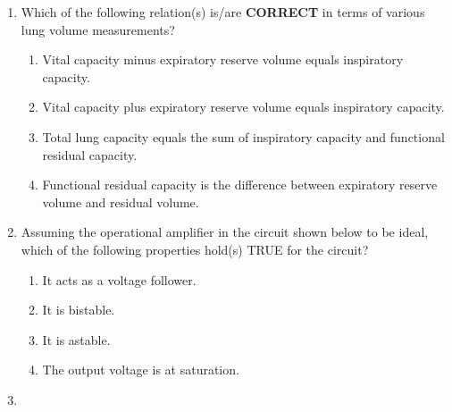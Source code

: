 \documentclass[journal]{IEEEtran}
\begin{document}
\begin{enumerate}
\item 
Which of the following relation(s) is/are \textbf{CORRECT} in terms of various lung volume measurements?

\begin{enumerate}[label=(\Alph*)]
    \item Vital capacity minus expiratory reserve volume equals inspiratory capacity.
    \item Vital capacity plus expiratory reserve volume equals inspiratory capacity.
    \item Total lung capacity equals the sum of inspiratory capacity and functional residual capacity.
    \item Functional residual capacity is the difference between expiratory reserve volume and residual volume.
\end{enumerate}
\hfill{}

\item 
Assuming the operational amplifier in the circuit shown below to be ideal, which of the following properties hold(s) TRUE for the circuit?

\begin{figure}[H]
\centering
{}%

\label{fig:my_label}
\end{figure}

\begin{enumerate}[label=(\Alph*)]
    \item It acts as a voltage follower.
    \item It is bistable.
    \item It is astable.
    \item The output voltage is at saturation.
\end{enumerate}
\hfill{}
 \item 
 

\end{enumerate}
\end{document}
